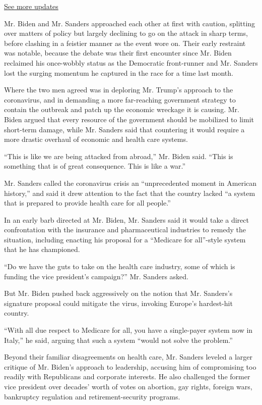 \href{https://www.nytimes.com/2020/07/31/us/elections/biden-vs-trump.html?action=click\&pgtype=Article\&state=default\&region=MAIN_CONTENT_1\&context=storylines_live_updates}{See
more updates}

Mr. Biden and Mr. Sanders approached each other at first with caution,
splitting over matters of policy but largely declining to go on the
attack in sharp terms, before clashing in a feistier manner as the event
wore on. Their early restraint was notable, because the debate was their
first encounter since Mr. Biden reclaimed his once-wobbly status as the
Democratic front-runner and Mr. Sanders lost the surging momentum he
captured in the race for a time last month.

Where the two men agreed was in deploring Mr. Trump's approach to the
coronavirus, and in demanding a more far-reaching government strategy to
contain the outbreak and patch up the economic wreckage it is causing.
Mr. Biden argued that every resource of the government should be
mobilized to limit short-term damage, while Mr. Sanders said that
countering it would require a more drastic overhaul of economic and
health care systems.

``This is like we are being attacked from abroad,'' Mr. Biden said.
``This is something that is of great consequence. This is like a war.''

Mr. Sanders called the coronavirus crisis an ``unprecedented moment in
American history,'' and said it drew attention to the fact that the
country lacked ``a system that is prepared to provide health care for
all people.''

In an early barb directed at Mr. Biden, Mr. Sanders said it would take a
direct confrontation with the insurance and pharmaceutical industries to
remedy the situation, including enacting his proposal for a ``Medicare
for all''-style system that he has championed.

``Do we have the guts to take on the health care industry, some of which
is funding the vice president's campaign?'' Mr. Sanders asked.

But Mr. Biden pushed back aggressively on the notion that Mr. Sanders's
signature proposal could mitigate the virus, invoking Europe's
hardest-hit country.

``With all due respect to Medicare for all, you have a single-payer
system now in Italy,'' he said, arguing that such a system ``would not
solve the problem.''

Beyond their familiar disagreements on health care, Mr. Sanders leveled
a larger critique of Mr. Biden's approach to leadership, accusing him of
compromising too readily with Republicans and corporate interests. He
also challenged the former vice president over decades' worth of votes
on abortion, gay rights, foreign wars, bankruptcy regulation and
retirement-security programs.

